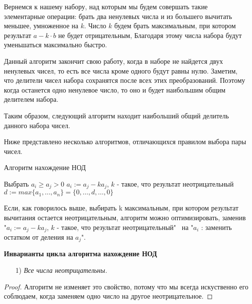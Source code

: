 \documentclass[russian]{lecture-notes}
\begin{document}
Вернемся к нашему набору, над которым мы будем совершать такие элементарные операции: брать два ненулевых числа и из большего вычитать меньшее, умноженное на $k$. Число $k$ будем брать максимальным, при котором результат $a - k \cdot b$ не будет отрицательным, Благодаря этому числа набора будут уменьшаться максимально быстро.

Данный алгоритм закончит свою работу, когда в наборе не найдется двух ненулевых чисел, то есть все числа кроме одного будут равны нулю. Заметим, что делители чисел набора сохранятся после всех этих преобразований. Поэтому когда останется одно ненулевое число, то оно и будет наибольшим общим делителем набора.

Таким образом, следующий алгоритм находит наибольший общий делитель данного набора чисел.

Ниже представлено несколько алгоритмов, отличающихся правилом выбора пары чисел.

\begin{algorithm}[h!]
	\caption{Алгоритм нахождение НОД}
	\begin{algorithmic}[1]
	    \State Выбрать $a_i \geq a_j > 0$
	    \State $a_i := a_j - ka_j$, $k$ - такое, что результат неотрицательный
	    \EndWhile
	    \State $d := max \{a_1,\ldots,a_n\} = \{0,\ldots,d,\ldots,0\}$
	\end{algorithmic}
	\label{alg:1}
\end{algorithm}

\begin{note}
    Если, как говорилось выше, выбирать k максимальным, при котором результат вычитания остается неотрицательным, алгоритм можно оптимизировать, заменив "$a_i := a_j - ka_j$, $k$ - такое, что результат неотрицательный" \ на "$a_i$ : заменить остатком от деления на $a_j$".
\end{note}

\textbf{Инварианты цикла алгоритма нахождение НОД}

\begin{itemize}
    \item[1)] \emph{Все числа неотрицательны.}
\end{itemize}

\begin{proof}
    Алгоритм не изменяет это свойство, потому что мы всегда искуственно его соблюдаем, когда заменяем одно число на другое неотрицательное.
\end{proof}
\end{document}
